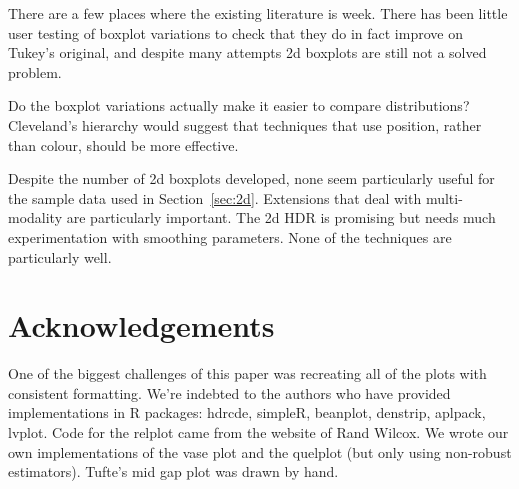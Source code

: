 \documentclass[oneside]{article}
\begin{document}
There are a few places where the existing literature is week. There has been little user testing of boxplot variations to check that they do in fact improve on Tukey's original, and despite many attempts 2d boxplots are still not a solved problem.  

Do the boxplot variations actually make it easier to compare distributions? Cleveland's hierarchy \citep{cleveland:1984} would suggest that techniques that use position, rather than colour, should be more effective. 

Despite the number of 2d boxplots developed, none seem particularly useful for the sample data used in Section~\ref{sec:2d}. Extensions that deal with multi-modality are particularly important. The 2d HDR is promising but needs much experimentation with smoothing parameters.  None of the techniques are particularly well.

\section{Acknowledgements}
\label{sec:acknowledgements}

One of the biggest challenges of this paper was recreating all of the plots with consistent formatting. We're indebted to the authors who have provided implementations in R packages: hdrcde, simpleR, beanplot, denstrip, aplpack, lvplot. Code for the relplot came from the website of Rand Wilcox. We wrote our own implementations of the vase plot and the quelplot (but only using non-robust estimators). Tufte's mid gap plot was drawn by hand.


\end{document}
